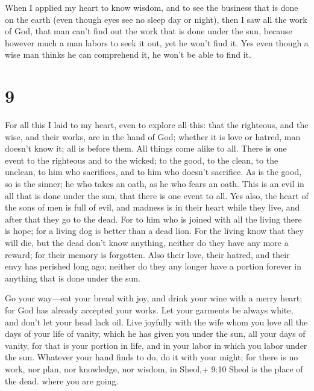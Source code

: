  When I applied my heart to know wisdom, and to see the
business that is done on the earth (even though eyes see no sleep day or
night),  then I saw all the work of God, that man can't
find out the work that is done under the sun, because however much a man
labors to seek it out, yet he won't find it. Yes even though a wise man
thinks he can comprehend it, he won't be able to find it.

\hypertarget{section-8}{%
\section{9}\label{section-8}}

 For all this I laid to my heart, even to explore all this:
that the righteous, and the wise, and their works, are in the hand of
God; whether it is love or hatred, man doesn't know it; all is before
them.  All things come alike to all. There is one event to
the righteous and to the wicked; to the good, to the clean, to the
unclean, to him who sacrifices, and to him who doesn't sacrifice. As is
the good, so is the sinner; he who takes an oath, as he who fears an
oath.  This is an evil in all that is done under the sun,
that there is one event to all. Yes also, the heart of the sons of men
is full of evil, and madness is in their heart while they live, and
after that they go to the dead.  For to him who is joined
with all the living there is hope; for a living dog is better than a
dead lion.  For the living know that they will die, but the
dead don't know anything, neither do they have any more a reward; for
their memory is forgotten.  Also their love, their hatred,
and their envy has perished long ago; neither do they any longer have a
portion forever in anything that is done under the sun.

 Go your way---eat your bread with joy, and drink your wine
with a merry heart; for God has already accepted your works.
 Let your garments be always white, and don't let your head
lack oil.  Live joyfully with the wife whom you love all the
days of your life of vanity, which he has given you under the sun, all
your days of vanity, for that is your portion in life, and in your labor
in which you labor under the sun.  Whatever your hand finds
to do, do it with your might; for there is no work, nor plan, nor
knowledge, nor wisdom, in Sheol,+ 9:10 Sheol is the place of the dead.
where you are going.

